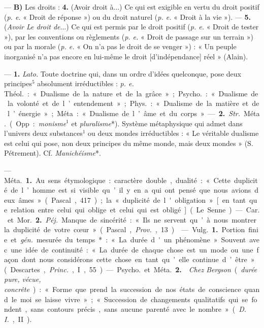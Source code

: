 \begin{itemize}[leftmargin=1cm, label=, itemsep=1pt]
— {\bf B)} Les droits : {\bf 4.} (Avoir droit
à...) Ce qui est exigible en vertu
du droit positif ({\it p. e.} « Droit de réponse ») ou du droit naturel ({\it p. e.}
« Droit à la vie »). — {\bf 5.} ({\it Avoir Le
droit de}...) Ce qui est permis par le
droit positif ({\it p. e.} « Droit de tester »),
par les conventions ou règlements
({\it p. e.} « Droit de passage sur un terrain ») ou par la morale ({\it p. e.} « On
n’a pas le droit de se venger ») : « Un
peuple inorganisé n’a pas encore en
lui-même le droit [d'indépendance]
réel » (Alain).

 — {\bf 1.} {\it Lato.} Toute doctrine
qui, dans un ordre d'idées quelconque, pose deux principes$^5$ absolument irréductibles : {\it p. e.} \si{Théol.} :
« Dualisme de la nature et de la
grâce » ; \si{Psycho.} : « Dualisme de la
volonté et de l’entendement » ;
\si{Phys.} : « Dualisme de la matière et
de l’énergie » ; Méta : « Dualisme de
l’âme et du corps ».

— {\bf 2.} {\it Str.} \si{Méta.} (Opp. : {\it monisme}$^1$
et {\it pluralisme}*).  Système métaphysique qui admet dans l’univers deux
substances$^1$ ou deux mondes irréductibles : « Le véritable dualisme
est celui qui pose, non deux principes du même monde, mais deux
mondes » (S. Pétrement). Cf. {\it Manichéisme}*.

 — \si{Méta.} {\bf 1.} Au sens étymologique : caractère double, dualité :
« Cette duplicité de l’homme est si
visible qu’il y en a qui ont pensé
que nous avions deux âmes » (Pascal,
417); la « duplicité de l'obligation »
[en tant que relation entre celui qui
oblige et celui qui est obligé] (Le
Senne).

— \si{Car.} et \si{Mor.} {\bf 2.} {\it Péj.} Manque de
sincérité : « Ils ne servent qu’à nous
montrer la duplicité de votre cœur »
(Pascal, {\it Prov.}, 13).

 — \si{Vulg.} {\bf 1.} Portion finie et  {\it gén.}
mesurée du temps* : « La durée
d'un phénomène ». Souvent avec
une idée de continuité : « La durée
de chaque chose est un mode ou une
façon dont nous considérons cette
chose en tant qu’elle continue d’être»
(Descartes, {\it Princ.}, I, 55).

— \si{Psycho.} et \si{Méta.} {\bf 2.}  {\it Chez
Bergson} ({\it durée pure, vécue, concrête}) : « Forme que prend la succession de nos états de conscience
quand le moi se laisse vivre »; « Succession de changements qualitatifs
qui se fondent, sans contours précis,... sans aucune parenté avec le
nombre » ({\it D. I.}, II).


\end{itemize}
